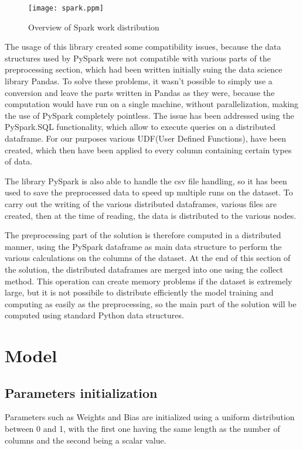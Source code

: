 \documentclass[
	letterpaper, %
	10pt, %
]{class}
\begin{document}
\begin{figure}
  \texttt{[image: spark.ppm]}
  \caption{Overview of Spark work distribution}
  \label{fig:spark}
\end{figure}

The usage of this library created some compatibility issues, because the data structures used by PySpark were not compatible with various parts of the preprocessing section, which had been written initially suing the data science library Pandas.
To solve these problems, it wasn't possible to simply use a conversion and leave the parts written in Pandas as they were, because the computation would have run on a single machine, without parallelization, making the use of PySpark completely pointless.
The issue has been addressed using the PySpark.SQL functionality, which allow to execute queries on a distributed dataframe. For our purposes various UDF(User Defined Functions), have been created, which then have been applied to every column containing certain types of data.

The library PySpark is also able to handle the csv file handling, so it has been used to save the preprocessed data to speed up multiple runs on the dataset. To carry out the writing of the various distributed dataframes, various files are created, then at the time of reading, the data is distributed to the various nodes.

The preprocessing part of the solution is therefore computed in a distributed manner, using the PySpark dataframe as main data structure to perform the various calculations on the columns of the dataset.
At the end of this section of the solution, the distributed dataframes are merged into one using the collect method. This operation can create memory problems if the dataset is extremely large, but it is not possibile to distribute efficiently the model training
and computing as easily as the preprocessing, so the main part of the solution will be computed using standard Python data structures.


\section{Model}

\subsection{Parameters initialization}
Parameters such as Weights and Bias are initialized using a uniform distribution between 0 and 1, with the first one having the same length as the number of columns and the second being a scalar value.
\end{document}
